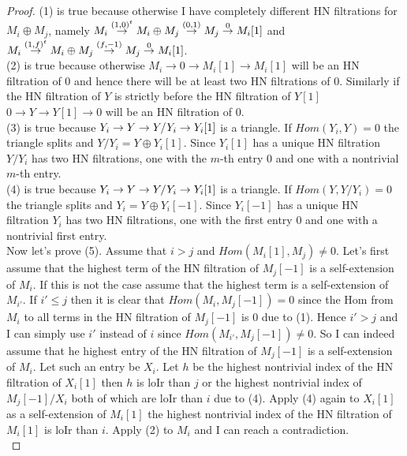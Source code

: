 \begin{proof}
\indent (1) is true because otherwise I have completely different HN filtrations for $M_i\oplus M_j$, namely $M_i\overset{(1,0)^t}{\to} M_i\oplus M_j\overset{(0,1)}{\to} M_j\overset{0}{\to} M_i[1]$ and $M_i\overset{(1,f)^t}{\to} M_i\oplus M_j\overset{(f,-1)}{\to} M_j\overset{0}{\to} M_i[1]$.\\
\indent (2) is true because otherwise $M_i\to 0\to M_i[1]\to M_i[1]$ will be an HN filtration of 0 and hence there will be at least two HN filtrations of 0. Similarly if the HN filtration of $Y$ is strictly before the HN filtration of $Y[1]$ $0\to Y\to Y[1]\to 0$ will be an HN filtration of 0.\\
\indent (3) is true because $Y_i\to Y\to Y/Y_i\to Y_i[1]$ is a triangle. If $Hom(Y_i,Y)= 0$ the triangle splits and $Y/Y_i = Y\oplus Y_i[1]$. Since $Y_i[1]$ has a unique HN filtration $Y/Y_i$ has two HN filtrations, one with the $m$-th entry 0 and one with a nontrivial $m$-th entry. \\
\indent (4) is true because $Y_i\to Y\to Y/Y_i\to Y_i[1]$ is a triangle. If $Hom(Y,Y/Y_i)= 0$ the triangle splits and $Y_i = Y\oplus Y_i[-1]$. Since $Y_i[-1]$ has a unique HN filtration $Y_i$ has two HN filtrations, one with the first entry 0 and one with a nontrivial first entry. \\
\indent Now let's prove (5). Assume that $i>j$ and $Hom(M_i[1],M_j) \neq 0$. Let's first assume that the highest term of the HN filtration of $M_j[-1]$ is a self-extension of $M_i$. If this is not the case assume that the highest term is a self-extension of $M_{i'}$. If $i'\leq j$ then it is clear that $Hom(M_i,M_j[-1])=0$ since the Hom from $M_i$ to all terms in the HN filtration of $M_j[-1]$ is 0 due to (1). Hence $i'>j$ and I can simply use $i'$ instead of $i$ since $Hom(M_{i'},M_j[-1])\neq 0$. So I can indeed assume that he highest entry of the HN filtration of $M_j[-1]$ is a self-extension of $M_i$. Let such an entry be $X_i$. Let $h$ be the highest nontrivial index of the HN filtration of $X_i[1]$ then $h$ is loIr than $j$ or the highest nontrivial index of $M_j[-1]/X_i$ both of which are loIr than $i$ due to (4). Apply (4) again to $X_i[1]$ as a self-extension of $M_i[1]$ the highest nontrivial index of the HN filtration of $M_i[1]$ is loIr than $i$. Apply (2) to $M_i$ and I can reach a contradiction.\\

\end{proof}
